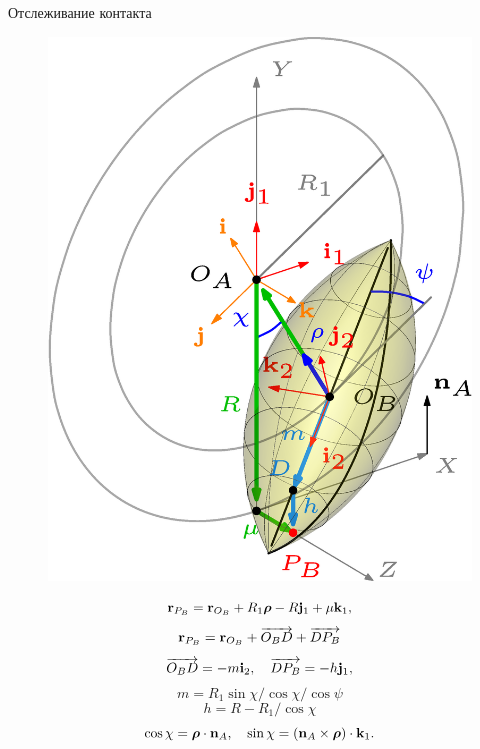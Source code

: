 \begin{frame}{Отслеживание контакта}
        \begin{figure}[htb]
            \centering\includegraphics[width=\textwidth]{content/pic/asy/pic_mecanum.png}
            \label{ContactScheme}
        \end{figure}
    \endminipage
    \quad
        $$
        {\bf r}_{P_B}={\bf r}_{O_B}+R_1\boldsymbol{\mathbf{\rho}} -R{\bf j}_1+\mu {\bf k}_1,
        $$
        $$
        {\bf r}_{P_B}={\bf r}_{O_B}+\overrightarrow{O_BD}+\overrightarrow{DP_B}
        $$
        $$
        \overrightarrow{O_BD}=-m{\bf i}_2,\quad\overrightarrow{DP_B}=-h{\bf j}_1,
        $$
        $$m=R_1\sin\chi / \cos\chi/\cos\psi $$
        $$h=R-R_1/\cos\chi$$
        $$
        \cos\chi=\boldsymbol{\mathbf{\rho}}\cdot{\bf n}_A, \quad \sin\chi=
        \left({\bf n}_A\times\boldsymbol{\mathbf{\rho}}\right)\cdot {\bf k}_1.
        $$
    \endminipage
\end{frame}